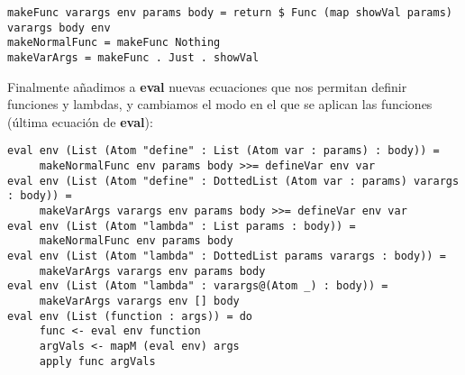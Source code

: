 \begin{minipage}{\linewidth}
\begin{tiny}
\begin{lstlisting}[frame=single]
makeFunc varargs env params body = return $ Func (map showVal params) varargs body env
makeNormalFunc = makeFunc Nothing
makeVarArgs = makeFunc . Just . showVal
\end{lstlisting}
\end{tiny}
\end{minipage}

Finalmente a\~{n}adimos a \textbf{eval} nuevas ecuaciones que nos permitan definir funciones y lambdas, y cambiamos el modo en el que se aplican las funciones (\'ultima ecuaci\'on de \textbf{eval}):\\

\begin{minipage}{\linewidth}
\begin{scriptsize}
\begin{lstlisting}[frame=single]
eval env (List (Atom "define" : List (Atom var : params) : body)) =
     makeNormalFunc env params body >>= defineVar env var
eval env (List (Atom "define" : DottedList (Atom var : params) varargs : body)) =
     makeVarArgs varargs env params body >>= defineVar env var
eval env (List (Atom "lambda" : List params : body)) =
     makeNormalFunc env params body
eval env (List (Atom "lambda" : DottedList params varargs : body)) =
     makeVarArgs varargs env params body
eval env (List (Atom "lambda" : varargs@(Atom _) : body)) =
     makeVarArgs varargs env [] body
eval env (List (function : args)) = do
     func <- eval env function
     argVals <- mapM (eval env) args
     apply func argVals
\end{lstlisting}
\end{scriptsize}
\end{minipage}